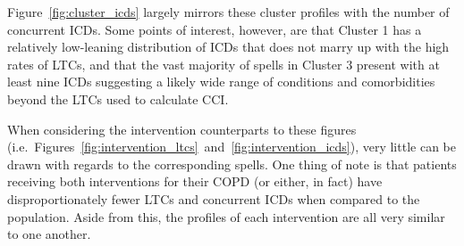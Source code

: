 Figure~\ref{fig:cluster_icds} largely mirrors these cluster profiles with the
number of concurrent ICDs. Some points of interest, however, are that Cluster 1
has a relatively low-leaning distribution of ICDs that does not marry up with
the high rates of LTCs, and that the vast majority of spells in Cluster 3
present with at least nine ICDs suggesting a likely wide range of conditions and
comorbidities beyond the LTCs used to calculate CCI.\

When considering the intervention counterparts to these figures (i.e.\
Figures~\ref{fig:intervention_ltcs}~and~\ref{fig:intervention_icds}), very
little can be drawn with regards to the corresponding spells. One thing of note
is that patients receiving both interventions for their COPD (or either, in
fact) have disproportionately fewer LTCs and concurrent ICDs when compared to
the population. Aside from this, the profiles of each intervention are all very
similar to one another.
